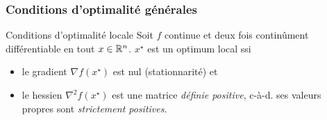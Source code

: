
  

\begin{frame}
  \frametitle{Conditions d'optimalité générales}

  \begin{block}{Conditions d'optimalité locale}
    Soit $f$ continue et deux fois continûment différentiable en tout $x \in {\ensuremath\mathbb{R}}^n$.
    $x^\star$ est un optimum local ssi
    \begin{itemize}
    \item le gradient ${\nabla f}(x^\star)$ est nul (stationnarité) et
    \item le hessien $\nabla^2f(x^\star)$ est une matrice \emph{définie positive},
      c-à-d. ses valeurs propres sont \emph{strictement positives}.
    \end{itemize}
  \end{block}

  
\end{frame}

